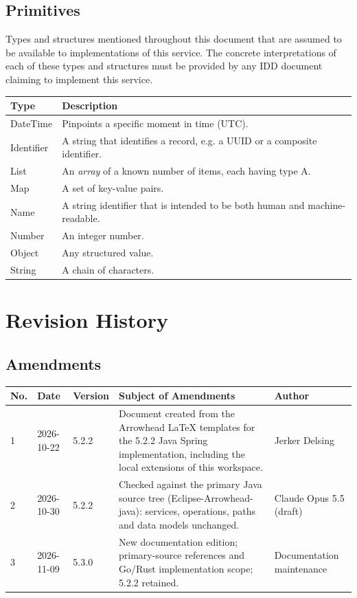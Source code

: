 \documentclass[a4paper]{arrowhead}
\newcommand{\pdef}[1]{{\textcolor{ArrowheadGrey}{#1\label{sec:model:primitives:#1}\label{sec:model:primitives:#1s}\label{sec:model:primitives:#1es}}}}
\begin{document}
\subsection{Primitives}
\label{sec:model:primitives}

Types and structures mentioned throughout this document that are assumed to be available to implementations of this service.
The concrete interpretations of each of these types and structures must be provided by any IDD document claiming to implement this service.

\noindent\begin{tabularx}{\textwidth}{| p{4.6cm} | X |} \hline
\rowcolor{gray!33} Type & Description \\ \hline
\pdef{DateTime} & Pinpoints a specific moment in time (UTC). \\ \hline
\pdef{Identifier} & A string that identifies a record, e.g. a UUID or a composite identifier. \\ \hline
\pdef{List} & An \textit{array} of a known number of items, each having type A. \\ \hline
\pdef{Map} & A set of key-value pairs. \\ \hline
\pdef{Name} & A string identifier that is intended to be both human and machine-readable. \\ \hline
\pdef{Number} & An integer number. \\ \hline
\pdef{Object} & Any structured value. \\ \hline
\pdef{String} & A chain of characters. \\ \hline
\end{tabularx}

\newpage




\newpage

\section{Revision History}
\subsection{Amendments}

\noindent\begin{tabularx}{\textwidth}{| p{1cm} | p{3cm} | p{2cm} | X | p{4cm} |} \hline
\rowcolor{gray!33} No. & Date & Version & Subject of Amendments & Author \\ \hline

1 & 2026-10-22 & 5.2.2 & Document created from the Arrowhead LaTeX templates for the 5.2.2 Java Spring implementation, including the local extensions of this workspace. & Jerker Delsing \\ \hline
2 & 2026-10-30 & 5.2.2 & Checked against the primary Java source tree (Eclipse-Arrowhead-java): services, operations, paths and data models unchanged. & Claude Opus 5.5 (draft) \\ \hline
3 & 2026-11-09 & 5.3.0 & New documentation edition; primary-source references and Go/Rust implementation scope; 5.2.2 retained. & Documentation maintenance \\ \hline
\end{tabularx}
\end{document}
